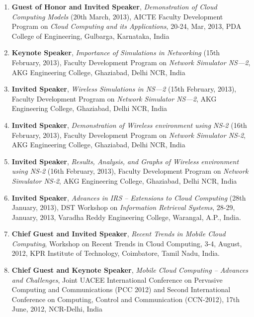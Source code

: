 \begin{enumerate}
\item
\textbf{Guest of Honor and Invited Speaker}, \textit{Demonstration of Cloud Computing Models} (20th March, 2013), AICTE Faculty Development Program on \textit{Cloud Computing and its Applications}, 20-24, Mar, 2013, PDA College of Engineering, Gulbarga, Karnataka, India

\item
\textbf{Keynote Speaker}, \textit{Importance of Simulations in Networking} (15th February, 2013), Faculty Development Program on \textit{Network Simulator NS—2}, AKG Engineering College, Ghaziabad, Delhi NCR, India

\item
\textbf{Invited Speaker}, \textit{Wireless Simulations in NS—2} (15th February, 2013), Faculty Development Program on \textit{Network Simulator NS—2}, AKG Engineering College, Ghaziabad, Delhi NCR, India

\item
\textbf{Invited Speaker}, \textit{Demonstration of Wireless environment using NS-2} (16th February, 2013), Faculty Development Program on \textit{Network Simulator NS-2}, AKG Engineering College, Ghaziabad, Delhi NCR, India

\item
\textbf{Invited Speaker}, \textit{Results, Analysis, and Graphs of Wireless environment using NS-2} (16th February, 2013), Faculty Development Program on \textit{Network Simulator NS-2}, AKG Engineering College, Ghaziabad, Delhi NCR, India

\item
\textbf{Invited Speaker}, \textit{Advances in IRS – Extensions to Cloud Computing} (28th January, 2013), DST Workshop on \textit{Information Retrieval Systems}, 28-29, January, 2013, Varadha Reddy Engineering College, Warangal, A.P., India.

\item
\textbf{Chief Guest and Invited Speaker}, \textit{Recent Trends in Mobile Cloud Computing}, Workshop on Recent Trends in Cloud Computing, 3-4, August, 2012, KPR Institute of Technology, Coimbatore, Tamil Nadu, India.

\item
\textbf{Chief Guest and Keynote Speaker}, \textit{Mobile Cloud Computing – Advances and Challenges}, Joint UACEE International Conference on Pervasive Computing and Communications (PCC 2012) and Second International Conference on Computing, Control and Communication (CCN-2012), 17th June, 2012, NCR-Delhi, India


\end{enumerate}
